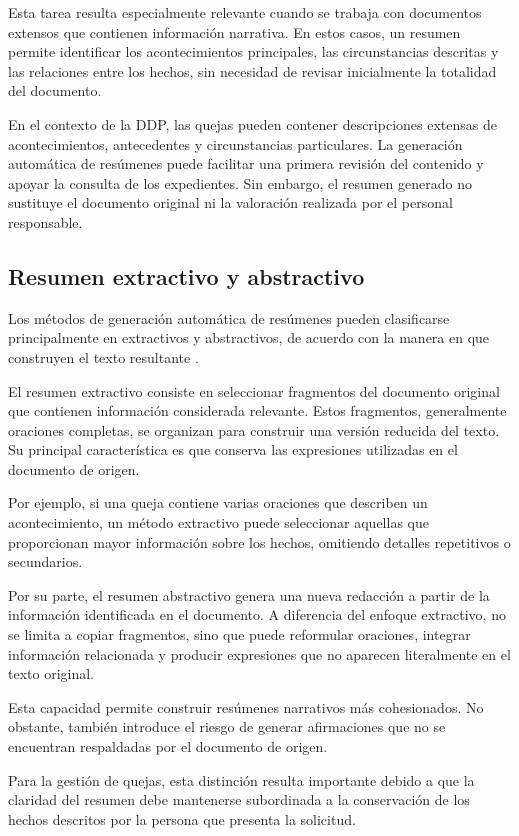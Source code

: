 Esta tarea resulta especialmente relevante cuando se trabaja con documentos extensos que contienen información narrativa. En estos casos, un resumen permite identificar los acontecimientos principales, las circunstancias descritas y las relaciones entre los hechos, sin necesidad de revisar inicialmente la totalidad del documento.

En el contexto de la DDP, las quejas pueden contener descripciones extensas de acontecimientos, antecedentes y circunstancias particulares. La generación automática de resúmenes puede facilitar una primera revisión del contenido y apoyar la consulta de los expedientes. Sin embargo, el resumen generado no sustituye el documento original ni la valoración realizada por el personal responsable.

\subsection{Resumen extractivo y abstractivo}

Los métodos de generación automática de resúmenes pueden clasificarse principalmente en extractivos y abstractivos, de acuerdo con la manera en que construyen el texto resultante \cite{jurafsky2023slp}.

El resumen extractivo consiste en seleccionar fragmentos del documento original que contienen información considerada relevante. Estos fragmentos, generalmente oraciones completas, se organizan para construir una versión reducida del texto. Su principal característica es que conserva las expresiones utilizadas en el documento de origen.

Por ejemplo, si una queja contiene varias oraciones que describen un acontecimiento, un método extractivo puede seleccionar aquellas que proporcionan mayor información sobre los hechos, omitiendo detalles repetitivos o secundarios.

Por su parte, el resumen abstractivo genera una nueva redacción a partir de la información identificada en el documento. A diferencia del enfoque extractivo, no se limita a copiar fragmentos, sino que puede reformular oraciones, integrar información relacionada y producir expresiones que no aparecen literalmente en el texto original.

Esta capacidad permite construir resúmenes narrativos más cohesionados. No obstante, también introduce el riesgo de generar afirmaciones que no se encuentran respaldadas por el documento de origen.

Para la gestión de quejas, esta distinción resulta importante debido a que la claridad del resumen debe mantenerse subordinada a la conservación de los hechos descritos por la persona que presenta la solicitud.

